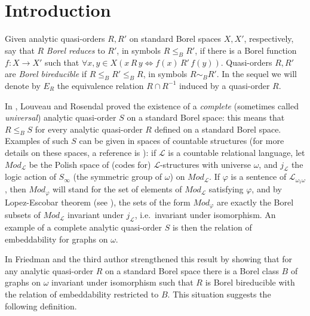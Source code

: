 \documentclass{amsart}
\theoremstyle{definition}
\theoremstyle{remark}
\begin{document}
\maketitle

\section{Introduction}

Given analytic quasi-orders $R,R'$ on standard Borel spaces $X,X'$,
respectively, say that $R$ \emph{Borel reduces} to $R'$, in symbols
$R \leq_B R'$, if there is a Borel function $f \colon X \to X'$ such that
$\forall x,y \in X  (x\, R\, y \iff f(x)\, R'\, f(y))$.
Quasi-orders $R,R'$ are \emph{Borel bireducible} if $R \leq_B R' \leq_B
R$, in symbols $R \sim_B R'$.
In the sequel we will denote by $E_R$ the equivalence relation $R\cap R^{-1}$ induced by a quasi-order $R$.

In \cite{louros}, Louveau and Rosendal proved the existence of a \emph{complete}\label{completeness} (sometimes called
\emph{universal}) analytic quasi-order $S$ on a standard Borel space: this means that $R \leq_B S$ for every analytic
quasi-order $R$ defined on a standard Borel space.
Examples of such $S$ can be given in spaces of countable structures
(for more details on these spaces, a reference is
\cite[\S 16.C]{Kechris1995}): if ${\mathcal{L}}$ is a countable relational language, let $Mod_{\mathcal{L}}$ be
the Polish space of (codes for) ${\mathcal{L}}$-structures with
universe $\omega$, and $j_{\mathcal{L}}$ the
logic action of $S_\infty$ (the symmetric group of $\omega$) on
$Mod_{\mathcal{L}}$.
If $ {\varphi}$ is a sentence of ${\mathcal{L}}_{\omega_1 \omega}$, then $Mod_{\varphi}$
will stand for the set of elements of $Mod_{\mathcal{L}}$ satisfying ${\varphi}$, and
by Lopez-Escobar theorem (see \cite[Theorem 16.8]{Kechris1995}), the sets
of the form $Mod_{\varphi}$ are exactly the Borel subsets of $Mod_{\mathcal{L}}$
invariant under $j_{\mathcal{L}}$, i.e.\ invariant under isomorphism.
An example of a complete analytic quasi-order $S$ is then the relation
of embeddability for graphs on $\omega$.

In \cite{FriMot} Friedman and the third author strengthened this
result by showing that for
any analytic quasi-order $R$ on a standard Borel space there is a
Borel class $B$ of graphs on $\omega$ invariant under isomorphism
such that $R$ is Borel bireducible with the relation of embeddability
restricted to $B$.
This situation suggests the following definition.
\end{document}
